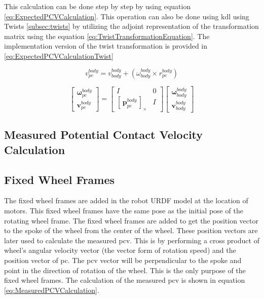 \documentclass[report.tex]{subfiles}
\begin{document}
        This calculation can be done step by step by using equation \ref{eq:ExpectedPCVCalculation}. This operation can also be done using \gls{kdl} using Twists \ref{subsec:twists} by utilizing the adjoint representation of the transformation matrix using the equation \ref{eq:TwistTransformationEquation}. The implementation version of the twist transformation is provided in \ref{eq:ExpectedPCVCalculationTwist}
    
        \begin{equation}
            v_{pc}^{body} = v_{body}^{body} + (\omega_{body}^{body} \times {}^{}r_{pc}^{body})
            \label{eq:ExpectedPCVCalculation}
        \end{equation}
                
        \begin{equation}
            \begin{bmatrix}
            \boldsymbol{\omega}_{pc}^{body} \\
            \mathbf{v}_{pc}^{body}
            \end{bmatrix}
            =
            \begin{bmatrix}
            I & 0 \\
            \left[\,\mathbf{p}_{pc}^{body}\,\right]_\times & I
            \end{bmatrix}
            \begin{bmatrix}
            \boldsymbol{\omega}_{body}^{body} \\
            \mathbf{v}_{body}^{body}
            \end{bmatrix}
            \label{eq:ExpectedPCVCalculationTwist}            
        \end{equation}
    
    \subsection{Measured Potential Contact Velocity Calculation}
        
    \subsection{Fixed Wheel Frames}
    
    The fixed wheel frames are added in the robot URDF model at the location of motors. This fixed wheel frames have the same pose as the initial pose of the rotating wheel frame. The fixed wheel frames are added to get the position vector to the spoke of the wheel from the center of the wheel. These position vectors are later used to calculate the measured \gls{pcv}. This is by performing a cross product of wheel's angular velocity vector (the vector form of rotation speed) and the position vector of \gls{pc}. The \gls{pcv} vector will be perpendicular to the spoke and point in the direction of rotation of the wheel. This is the only purpose of the fixed wheel frames. The calculation of the measured \gls{pcv} is shown in equation \ref{eq:MeasuredPCVCalculation}.
    
\end{document}
